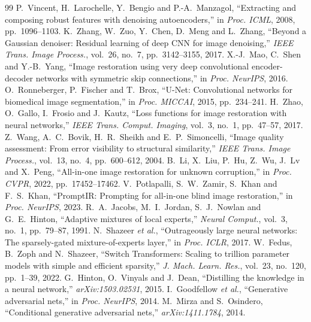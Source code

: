 \documentclass[conference]{IEEEtran}
\begin{document}
\begin{thebibliography}{99}
 P.~Vincent, H.~Larochelle, Y.~Bengio and P.-A.~Manzagol, ``Extracting and composing robust features with denoising autoencoders,'' in \emph{Proc. ICML}, 2008, pp.~1096--1103.
 K.~Zhang, W.~Zuo, Y.~Chen, D.~Meng and L.~Zhang, ``Beyond a Gaussian denoiser: Residual learning of deep CNN for image denoising,'' \emph{IEEE Trans. Image Process.}, vol.~26, no.~7, pp.~3142--3155, 2017.
 X.-J.~Mao, C.~Shen and Y.-B.~Yang, ``Image restoration using very deep convolutional encoder-decoder networks with symmetric skip connections,'' in \emph{Proc. NeurIPS}, 2016.
 O.~Ronneberger, P.~Fischer and T.~Brox, ``U-Net: Convolutional networks for biomedical image segmentation,'' in \emph{Proc. MICCAI}, 2015, pp.~234--241.
 H.~Zhao, O.~Gallo, I.~Frosio and J.~Kautz, ``Loss functions for image restoration with neural networks,'' \emph{IEEE Trans. Comput. Imaging}, vol.~3, no.~1, pp.~47--57, 2017.
 Z.~Wang, A.~C.~Bovik, H.~R.~Sheikh and E.~P.~Simoncelli, ``Image quality assessment: From error visibility to structural similarity,'' \emph{IEEE Trans. Image Process.}, vol.~13, no.~4, pp.~600--612, 2004.
 B.~Li, X.~Liu, P.~Hu, Z.~Wu, J.~Lv and X.~Peng, ``All-in-one image restoration for unknown corruption,'' in \emph{Proc. CVPR}, 2022, pp.~17452--17462.
 V.~Potlapalli, S.~W.~Zamir, S.~Khan and F.~S.~Khan, ``PromptIR: Prompting for all-in-one blind image restoration,'' in \emph{Proc. NeurIPS}, 2023.
 R.~A.~Jacobs, M.~I.~Jordan, S.~J.~Nowlan and G.~E.~Hinton, ``Adaptive mixtures of local experts,'' \emph{Neural Comput.}, vol.~3, no.~1, pp.~79--87, 1991.
 N.~Shazeer \emph{et al.}, ``Outrageously large neural networks: The sparsely-gated mixture-of-experts layer,'' in \emph{Proc. ICLR}, 2017.
 W.~Fedus, B.~Zoph and N.~Shazeer, ``Switch Transformers: Scaling to trillion parameter models with simple and efficient sparsity,'' \emph{J. Mach. Learn. Res.}, vol.~23, no.~120, pp.~1--39, 2022.
 G.~Hinton, O.~Vinyals and J.~Dean, ``Distilling the knowledge in a neural network,'' \emph{arXiv:1503.02531}, 2015.
 I.~Goodfellow \emph{et al.}, ``Generative adversarial nets,'' in \emph{Proc. NeurIPS}, 2014.
 M.~Mirza and S.~Osindero, ``Conditional generative adversarial nets,'' \emph{arXiv:1411.1784}, 2014.

\end{thebibliography}
\end{document}
